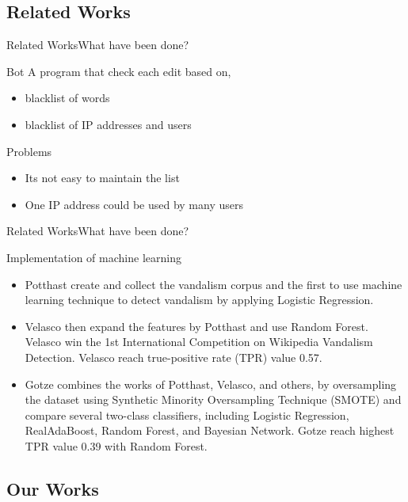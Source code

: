 \documentclass[english]{beamer}
\begin{document}
\subsection{Related Works}

\begin{frame}{Related Works}{What have been done?}
	\begin{block}{Bot}
		A program that check each edit based on,
		\begin{itemize}
		\item blacklist of words
		\item blacklist of IP addresses and users
		\end{itemize}
	\end{block}
	\pause
	\begin{alertblock}{Problems}
		\begin{itemize}
		\item Its not easy to maintain the list
		\item One IP address could be used by many users
		\end{itemize}
	\end{alertblock}
\end{frame}

\begin{frame}{Related Works}{What have been done?}
	\begin{block}{Implementation of machine learning}
		\begin{itemize}
		\item Potthast create and collect the vandalism corpus and the first to
		use machine learning technique to detect vandalism by applying Logistic
		Regression.
		\item Velasco then expand the features by Potthast and use Random
		Forest. Velasco win the 1st International Competition on Wikipedia
		Vandalism Detection. Velasco reach true-positive rate (TPR) value 0.57.
		\item Gotze combines the works of Potthast, Velasco, and others,
		by oversampling the dataset using Synthetic Minority Oversampling
		Technique (SMOTE) and compare several two-class classifiers, including
		Logistic Regression, RealAdaBoost, Random Forest, and Bayesian Network.
		Gotze reach highest TPR value 0.39 with Random Forest.
		\end{itemize}
	\end{block}
\end{frame}

\subsection{Our Works}
\end{document}
